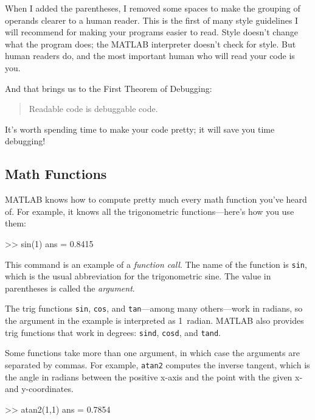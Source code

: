 When I added the parentheses, I removed some spaces to make the
grouping of operands clearer to a human reader.  This is the first
of many style guidelines I will recommend for making your programs
easier to read.  Style doesn't change what the program does; the MATLAB
interpreter doesn't check for style.  But human readers do, and the
most important human who will read your code is you.


And that brings us to the First Theorem of Debugging:

\begin{quote}
Readable code is debuggable code.
\end{quote}

It's worth spending time to make your code pretty; it will save
you time \mbox{debugging}!


\subsection{Math Functions}

MATLAB knows how to compute pretty much every math function you've
heard of. For example, it knows all the trigonometric functions---here's how you
use them:


\begin{code}
>> sin(1)
ans = 0.8415
\end{code}

This command is an example of a \emph{function call}.  The name of the
function is \lstinline{sin}, which is the usual abbreviation for the
trigonometric sine.  The value in parentheses is called the \emph{argument}.
%
%

The trig functions \lstinline{sin}, \lstinline{cos}, and  \lstinline{tan}---among many
others---work in radians, so the argument in the example is interpreted as 1~radian.
MATLAB also provides trig functions that work in degrees: \lstinline{sind}, \lstinline{cosd}, and \lstinline{tand}.

Some functions take more than one argument, in which case the arguments are
separated by commas.  For example, \lstinline{atan2} computes the inverse
tangent, which is the angle in radians between the positive x-axis and
the point with the given x- and y-coordinates.

\begin{code}
>> atan2(1,1)
ans = 0.7854
\end{code}

